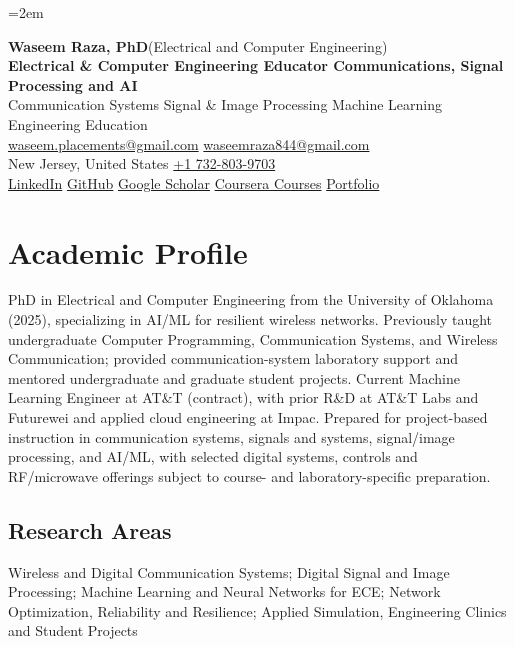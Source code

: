 \documentclass[8pt,letterpaper]{extarticle}
\begin{document}
\emergencystretch=2em
\begin{center}
{\LARGE\bfseries Waseem Raza, PhD}{\normalsize\mdseries \enspace (Electrical and Computer Engineering)}\\[2pt]
{\large\bfseries Electrical \& Computer Engineering Educator \textbar{} Communications, Signal Processing and AI}\\[1pt]
{\small Communication Systems \textbar{} Signal \& Image Processing \textbar{} Machine Learning \textbar{} Engineering Education}\\[3pt]
{\footnotesize {}\enspace \href{mailto:waseem.placements@gmail.com}{waseem.placements@gmail.com} \textbar{} \href{mailto:waseemraza844@gmail.com}{waseemraza844@gmail.com}\\[1pt]New Jersey, United States \quad {}\enspace \href{tel:+17328039703}{+1 732-803-9703}\\[1pt]\href{https://www.linkedin.com/in/waseem-raza-phd-9a737858/}{LinkedIn} \textbar{} \href{https://github.com/WaseemRaza844}{GitHub} \textbar{} \href{https://scholar.google.com/citations?user=d58Drr0AAAAJ\&hl=en}{Google Scholar} \textbar{} \href{https://waseemraza844.github.io/portfolio/learning.html}{Coursera Courses} \textbar{} \href{https://waseemraza844.github.io/portfolio/}{Portfolio}}
\end{center}
\vspace{-5pt}
\section{Academic Profile}
PhD in Electrical and Computer Engineering from the University of Oklahoma (2025), specializing in AI/ML for resilient wireless networks. Previously taught undergraduate Computer Programming, Communication Systems, and Wireless Communication; provided communication-system laboratory support and mentored undergraduate and graduate student projects. Current Machine Learning Engineer at AT\&T (contract), with prior R\&D at AT\&T Labs and Futurewei and applied cloud engineering at Impac. Prepared for project-based instruction in communication systems, signals and systems, signal/image processing, and AI/ML, with selected digital systems, controls and RF/microwave offerings subject to course- and laboratory-specific preparation.
\subsection{Research Areas}
Wireless and Digital Communication Systems; Digital Signal and Image Processing; Machine Learning and Neural Networks for ECE; Network Optimization, Reliability and Resilience; Applied Simulation, Engineering Clinics and Student Projects\par
{}
\end{document}
